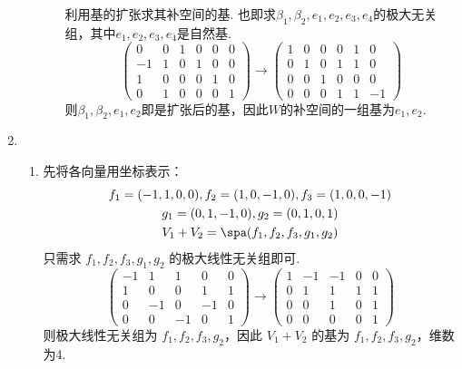 \begin{enumerate}
\begin{enumerate}
\begin{enumerate}
                              利用基的扩张求其补空间的基. 也即求$\beta_1,\beta_2,e_1,e_2,e_3,e_4$的极大无关组，其中$e_1,e_2,e_3,e_4$是自然基.
                              \[\begin{pmatrix}
                                      0  & 0 & 1 & 0 & 0 & 0 \\
                                      -1 & 1 & 0 & 1 & 0 & 0 \\
                                      1  & 0 & 0 & 0 & 1 & 0 \\
                                      0  & 1 & 0 & 0 & 0 & 1
                                  \end{pmatrix}\rightarrow
                                  \begin{pmatrix}1 & 0 & 0 & 0 & 1 & 0  \\
               0 & 1 & 0 & 1 & 1 & 0  \\
               0 & 0 & 1 & 0 & 0 & 0  \\
               0 & 0 & 0 & 1 & 1 & -1
                                  \end{pmatrix}\]
                              则$\beta_1,\beta_2,e_1,e_2$即是扩张后的基，因此$W$的补空间的一组基为$e_1,e_2$.
                    \end{enumerate}
          \end{enumerate} 

    \item \begin{enumerate}
              \item 先将各向量用坐标表示：
                    \begin{gather*}
                        f_1=(-1,1,0,0),f_2=(1,0,-1,0),f_3=(1,0,0,-1) \\
                        g_1=(0,1,-1,0),g_2=(0,1,0,1) \\
                        V_1+V_2=\spa(f_1,f_2,f_3,g_1,g_2)
                    \end{gather*}
                    只需求 $f_1,f_2,f_3,g_1,g_2$ 的极大线性无关组即可.
                    \[\begin{pmatrix}
                            -1 & 1  & 1  & 0  & 0 \\
                            1  & 0  & 0  & 1  & 1 \\
                            0  & -1 & 0  & -1 & 0 \\
                            0  & 0  & -1 & 0  & 1
                        \end{pmatrix}\rightarrow
                        \begin{pmatrix}1 & -1 & -1 & 0 & 0 \\
               0 & 1  & 1  & 1 & 1 \\
               0 & 0  & 1  & 0 & 1 \\
               0 & 0  & 0  & 0 & 1
                        \end{pmatrix}\]
                    则极大线性无关组为 $f_1,f_2,f_3,g_2$，因此 $V_1+V_2$ 的基为 $f_1,f_2,f_3,g_2$，维数为4.


\end{enumerate}
\end{enumerate}
